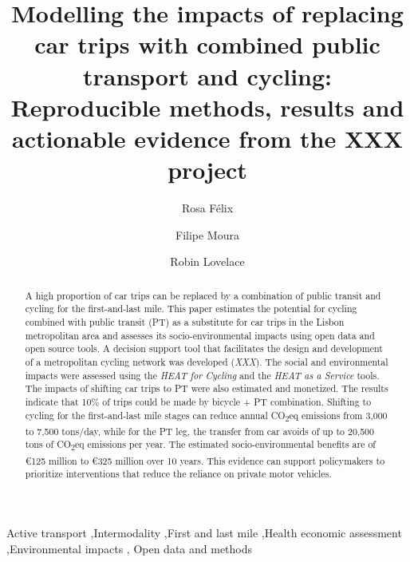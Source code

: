 \documentclass[review, doubleblind, 3p,
authoryear]{elsarticle} %
\begin{document}
\begin{frontmatter}

  \title{Modelling the impacts of replacing car trips with combined
public transport and cycling: Reproducible methods, results and
actionable evidence from the XXX project}
    \author[CERIS]{Rosa Félix%
  }
    \author[CERIS]{Filipe Moura%
  }
    \author[ITS]{Robin Lovelace%
  }
  
  \begin{abstract}
  A high proportion of car trips can be replaced by a combination of
  public transit and cycling for the first-and-last mile. This paper
  estimates the potential for cycling combined with public transit (PT)
  as a substitute for car trips in the Lisbon metropolitan area and
  assesses its socio-environmental impacts using open data and open
  source tools. A decision support tool that facilitates the design and
  development of a metropolitan cycling network was developed
  (\emph{XXX}). The social and environmental impacts were assessed using
  the \emph{HEAT for Cycling} and the \emph{HEAT as a Service} tools.
  The impacts of shifting car trips to PT were also estimated and
  monetized. The results indicate that 10\% of trips could be made by
  bicycle + PT combination. Shifting to cycling for the first-and-last
  mile stages can reduce annual CO\textsubscript{2}eq emissions from
  3,000 to 7,500 tons/day, while for the PT leg, the transfer from car
  avoids of up to 20,500 tons of CO\textsubscript{2}eq emissions per
  year. The estimated socio-environmental benefits are of €125 million
  to €325 million over 10 years. This evidence can support policymakers
  to prioritize interventions that reduce the reliance on private motor
  vehicles.\\
  \end{abstract}
    \begin{keyword}
    Active transport \sep Intermodality \sep First and last
mile \sep Health economic assessment \sep Environmental impacts \sep 
    Open data and methods
  \end{keyword}
  
 \end{frontmatter}
\end{document}
